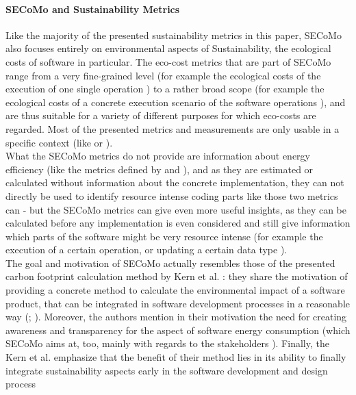 \documentclass[oribibl]{llncs}
\begin{document}
\paragraph{SECoMo and Sustainability Metrics}
Like the majority of the presented sustainability metrics %
in this paper, SECoMo also focuses entirely on environmental aspects of Sustainability, the ecological costs of software in particular. The eco-cost metrics that are part of SECoMo range from a very fine-grained level (for example the ecological costs of the execution of one single operation \cite{schulze_cost_2016}) to a rather broad scope (for example the ecological costs of a concrete execution scenario of the software operations \cite{schulze_cost_2016}), and are thus suitable for a variety of different purposes for which eco-costs are regarded. Most of the presented metrics and measurements are only usable in a specific context (like \cite{naumann_how_2008} or \cite{capra_is_2012}).\\ %
What the SECoMo metrics do not provide are information about energy efficiency (like the metrics defined by \cite{capra_is_2012} and \cite{johann_how_2012}), and as they are estimated or calculated without information about the concrete implementation, they can not directly be used to identify resource intense coding parts like those two metrics can - but the SECoMo metrics can give even more useful insights, as they can be calculated before any implementation is even considered and still give information which parts of the software might be very resource intense (for example the execution of a certain operation, or updating a certain data type \cite{schulze_cost_2016}).\\
The goal and motivation of SECoMo actually resembles those of the presented carbon footprint calculation method by Kern et al. \cite{kern_impacts_2015}: they share the motivation of providing a concrete method to calculate the environmental impact of a software product, that can be integrated in software development processes in a reasonable way %
(\cite{kern_impacts_2015}; \cite{schulze_cost_2016}). Moreover, the authors mention in their motivation the need for creating awareness and transparency for the aspect of software energy consumption \cite{kern_impacts_2015} (which SECoMo aims at, too, mainly with regards to the stakeholders \cite{schulze_cost_2016}). Finally, the Kern et al. emphasize that the benefit of their method lies in its ability to finally integrate sustainability aspects early in the software development and design process %
\end{document}
